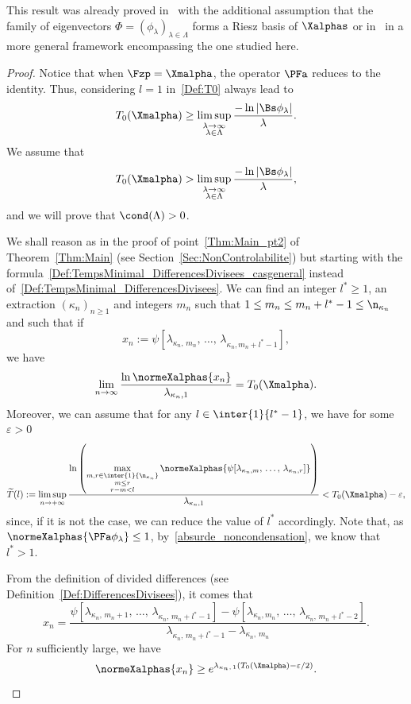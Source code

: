 This result was already proved in~\cite{AmmarKhodjaBenabdallahGonzalez-BurgosdeTeresa:2014} with the additional assumption that the family of eigenvectors $\Phi=(\phi_\lambda)_{\lambda \in \Lambda}$ forms a Riesz basis of $\Xalphas$ or in~\cite[Remark~1.15]{AKBGBM_2018} in a more general framework encompassing the one studied here.
\begin{proof}
Notice that when $\Fzp = \Xmalpha$, the operator $\PFa$ reduces to the identity. Thus, considering $l=1$ in~\eqref{Def:T0} always lead to
\[
T_{0}(\Xmalpha) \geq \limsup_{\substack{\lambda\to \infty\\ \lambda\in \Lambda}} \frac{-\ln \left| \Bs \phi_\lambda \right|}{\lambda}.
\]
We assume that
\begin{equation}\label{absurde_noncondensation}
T_{0}(\Xmalpha)>\limsup_{\substack{\lambda\to \infty\\ \lambda\in \Lambda}} \frac{-\ln \left| \Bs \phi_\lambda \right|}{\lambda},
\end{equation}
and we will prove that $\cond(\Lambda)>0$.

We shall reason as in the proof of point~\eqref{Thm:Main_pt2} of Theorem~\ref{Thm:Main} (see Section~\ref{Sec:NonControlabilite}) but starting with the formula~\eqref{Def:TempsMinimal_DifferencesDivisees_casgeneral} instead of~\eqref{Def:TempsMinimal_DifferencesDivisees}. We can find an integer $l^*\geq 1$, an extraction $(\kappa_n)_{n \geq 1}$ and integers $m_n$ such that $1\leq m_n\leq m_n+l^*-1\leq \n_{\kappa_n}$ and such that if
\[
x_n := \psi[\lambda_{\kappa_n,\,m_n},\,\dots,\, \lambda_{\kappa_n,m_n+l^*-1}],
\]
we have
\begin{equation*}\label{prop_ynbis}
\lim_{n \to \infty} \frac{\ln \normeXalphas{ x_n }}{\lambda_{\kappa_n,1}} = T_0(\Xmalpha).
\end{equation*}
Moreover, we can assume that for any $l \in \inter{1}{l^*-1}$, we have for some $\varepsilon>0$
\[
\widetilde{T}(l) := \limsup_{n \to + \infty} \frac{\ln \left(\max\limits_{\substack{m,r \in \inter{1}{\n_{\kappa_n}}\\ m\leq r \\ r-m < l} } \normeXalphas{ \psi[\lambda_{\kappa_n,m},\,\dots,\, \lambda_{\kappa_n,r}] } \right)}{\lambda_{\kappa_n,1}} < T_0(\Xmalpha)-\varepsilon,
\]
since, if it is not the case, we can reduce the value of $l^*$ accordingly. Note that, as $\normeXalphas{ \PFa \phi_\lambda } \leq 1$, by~\eqref{absurde_noncondensation}, we know that $l^*>1$.

From the definition of divided differences (see Definition~\ref{Def:DifferencesDivisees}), it comes that
\[
x_n = \frac{\psi[\lambda_{\kappa_n,\,m_n+1},\,\dots,\,\lambda_{\kappa_n,\,m_n+l^*-1}]-\psi[\lambda_{\kappa_n,m_n},\,\dots,\,\lambda_{\kappa_n,\,m_n+l^*-2}]}{\lambda_{\kappa_n,\,m_n+l^*-1}-\lambda_{\kappa_n,\,m_n}}.
\]
For $n$ sufficiently large, we have
\[
\normeXalphas{ x_n } \geq e^{\lambda_{\kappa_n,\,1} (T_0(\Xmalpha)-\varepsilon/2)}.
\]


\end{proof}
